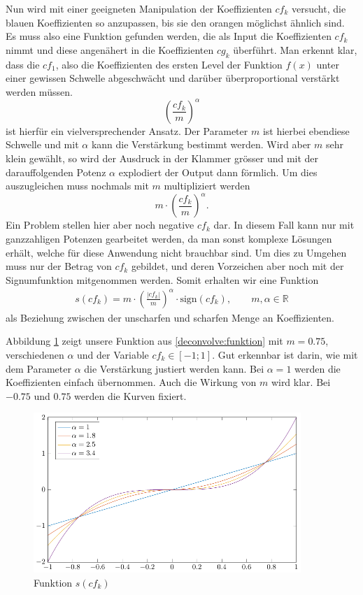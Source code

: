 Nun wird mit einer geeigneten Manipulation der Koeffizienten $cf_k$ versucht, die blauen Koeffizienten so anzupassen, bis sie den orangen möglichst ähnlich sind.
Es muss also eine Funktion gefunden werden, die als Input die Koeffizienten $cf_k$ nimmt und diese angenähert in die Koeffizienten $cg_k$ überführt.
Man erkennt klar, dass die $cf_1$, also die Koeffizienten des ersten Level der Funktion $f(x)$ unter einer gewissen Schwelle abgeschwächt und darüber überproportional verstärkt werden müssen.
$$\left( \frac{cf_k}{m}\right)^\alpha$$
ist hierfür ein vielversprechender Ansatz.
Der Parameter $m$ ist hierbei ebendiese Schwelle und mit $\alpha$ kann die Verstärkung bestimmt werden.
Wird aber $m$ sehr klein gewählt, so wird der Ausdruck in der Klammer grösser und mit der darauffolgenden Potenz $\alpha$ explodiert der Output dann förmlich.
Um dies auszugleichen muss nochmals mit $m$ multipliziert werden
$$m\cdot \left( \frac{cf_k}{m}\right)^\alpha.$$
Ein Problem stellen hier aber noch negative $cf_k$ dar. In diesem Fall kann nur mit ganzzahligen Potenzen gearbeitet werden, da man sonst komplexe Lösungen erhält, welche für diese Anwendung nicht brauchbar sind.
Um dies zu Umgehen muss nur der Betrag von $cf_k$ gebildet, und deren Vorzeichen aber noch mit der Signumfunktion mitgenommen werden.
Somit erhalten wir eine Funktion
\begin{align}
s(cf_k)=m\cdot \left(\frac{|cf_k|}{m}\right)^{\alpha}\cdot \text{sign}(cf_k), \qquad m,\alpha\in\mathbb{R}
\label{deconvolve:funktion}
\end{align}
als Beziehung zwischen der \glqq unscharfen\grqq{} und \glqq scharfen\grqq{} Menge an Koeffizienten.

Abbildung \ref{deconvolve:function} zeigt unsere Funktion aus \eqref{deconvolve:funktion} mit $m=0.75$, verschiedenen $\alpha$ und der Variable $cf_k\in[-1;1]$.
Gut erkennbar ist darin, wie mit dem Parameter $\alpha$ die Verstärkung justiert werden kann.
Bei $\alpha = 1$ werden die Koeffizienten einfach übernommen.
Auch die Wirkung von $m$ wird klar.
Bei $-0.75$ und $0.75$ werden die Kurven fixiert.
\begin{figure}[h]
\centering
\includegraphics[width=0.9\textwidth]{./papers/deconvolve/pictures/function.pdf}
\caption{Funktion $s(cf_k)$\label{deconvolve:function}}
\end{figure}

